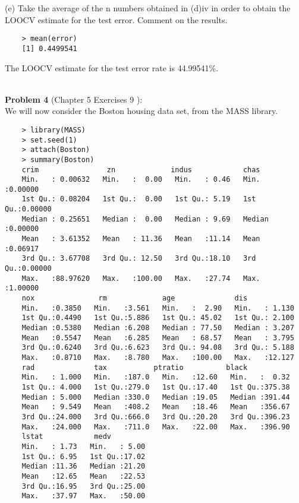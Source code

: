 \documentclass{article}
\begin{document}
\newpage

(e) Take the average of the n numbers obtained in (d)iv in order to obtain the LOOCV estimate for the test error. Comment on the results.


\begin{program}
	\begin{verbatim}
	> mean(error)
	[1] 0.4499541
	\end{verbatim}
\end{program}

The LOOCV estimate for the test error rate is 44.99541\%.
\\
\\
\newpage

{\bf Problem 4} (Chapter 5 Exercises 9 ):\\

We will now consider the Boston housing data set, from the MASS library.\\

\begin{program}
	\begin{verbatim}
	> library(MASS)
	> set.seed(1)
	> attach(Boston)
	> summary(Boston)
	crim                zn             indus            chas        
	Min.   : 0.00632   Min.   :  0.00   Min.   : 0.46   Min.   :0.00000  
	1st Qu.: 0.08204   1st Qu.:  0.00   1st Qu.: 5.19   1st Qu.:0.00000  
	Median : 0.25651   Median :  0.00   Median : 9.69   Median :0.00000  
	Mean   : 3.61352   Mean   : 11.36   Mean   :11.14   Mean   :0.06917  
	3rd Qu.: 3.67708   3rd Qu.: 12.50   3rd Qu.:18.10   3rd Qu.:0.00000  
	Max.   :88.97620   Max.   :100.00   Max.   :27.74   Max.   :1.00000  
	nox               rm             age              dis        
	Min.   :0.3850   Min.   :3.561   Min.   :  2.90   Min.   : 1.130  
	1st Qu.:0.4490   1st Qu.:5.886   1st Qu.: 45.02   1st Qu.: 2.100  
	Median :0.5380   Median :6.208   Median : 77.50   Median : 3.207  
	Mean   :0.5547   Mean   :6.285   Mean   : 68.57   Mean   : 3.795  
	3rd Qu.:0.6240   3rd Qu.:6.623   3rd Qu.: 94.08   3rd Qu.: 5.188  
	Max.   :0.8710   Max.   :8.780   Max.   :100.00   Max.   :12.127  
	rad              tax           ptratio          black       
	Min.   : 1.000   Min.   :187.0   Min.   :12.60   Min.   :  0.32  
	1st Qu.: 4.000   1st Qu.:279.0   1st Qu.:17.40   1st Qu.:375.38  
	Median : 5.000   Median :330.0   Median :19.05   Median :391.44  
	Mean   : 9.549   Mean   :408.2   Mean   :18.46   Mean   :356.67  
	3rd Qu.:24.000   3rd Qu.:666.0   3rd Qu.:20.20   3rd Qu.:396.23  
	Max.   :24.000   Max.   :711.0   Max.   :22.00   Max.   :396.90  
	lstat            medv      
	Min.   : 1.73   Min.   : 5.00  
	1st Qu.: 6.95   1st Qu.:17.02  
	Median :11.36   Median :21.20  
	Mean   :12.65   Mean   :22.53  
	3rd Qu.:16.95   3rd Qu.:25.00  
	Max.   :37.97   Max.   :50.00  
	\end{verbatim}
\end{program}
\end{document}
